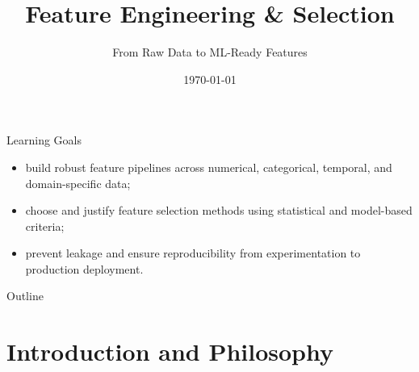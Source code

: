 \documentclass[aspectratio=169,11pt]{beamer}
\title[Feature Engineering]{Feature Engineering \& Selection}
\subtitle{From Raw Data to ML-Ready Features}
\date{\today}
\begin{document}
\begin{frame}
\titlepage
\end{frame}

\begin{frame}{Learning Goals}
\begin{itemize}
\item build robust feature pipelines across numerical, categorical, temporal, and domain-specific data;
\item choose and justify feature selection methods using statistical and model-based criteria;
\item prevent leakage and ensure reproducibility from experimentation to production deployment.
\end{itemize}
\end{frame}

\begin{frame}{Outline}
\tableofcontents
\end{frame}

\section{Introduction and Philosophy}
\end{document}
